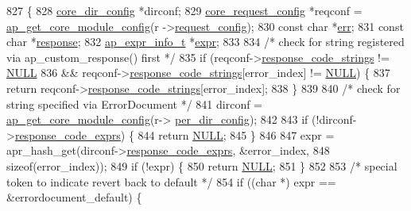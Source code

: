 \begin{DoxyCode}
827 \{
828     \hyperlink{structcore__dir__config}{core\_dir\_config} *dirconf;
829     \hyperlink{structcore__request__config}{core\_request\_config} *reqconf = \hyperlink{group__APACHE__CORE__HTTPD_ga5e96e185d9e95051576a4fbb7846ae51}{ap\_get\_core\_module\_config}(r
      ->\hyperlink{structrequest__rec_a64ddc7e883db1473c43254766c0c0c07}{request\_config});
830     \textcolor{keyword}{const} \textcolor{keywordtype}{char} *\hyperlink{group__AP__EXPR_gaccebe6c638c552d2845014cf8bdea8d8}{err};
831     \textcolor{keyword}{const} \textcolor{keywordtype}{char} *\hyperlink{group__MOD__DAV_ga61a23706db0e2c726e15a7a081345de7}{response};
832     \hyperlink{structap__expr__info__t}{ap\_expr\_info\_t} *\hyperlink{group__AP__EXPR_ga678330dc2f7e5114b38824a310f676ed}{expr};
833 
834     \textcolor{comment}{/* check for string registered via ap\_custom\_response() first */}
835     \textcolor{keywordflow}{if} (reqconf->\hyperlink{structcore__request__config_a12553976ceaa71260fc40cc5d3b41aa5}{response\_code\_strings} != \hyperlink{pcre_8txt_ad7f989d16aa8ca809a36bc392c07fba1}{NULL}
836             && reqconf->\hyperlink{structcore__request__config_a12553976ceaa71260fc40cc5d3b41aa5}{response\_code\_strings}[error\_index] != 
      \hyperlink{pcre_8txt_ad7f989d16aa8ca809a36bc392c07fba1}{NULL}) \{
837         \textcolor{keywordflow}{return} reqconf->\hyperlink{structcore__request__config_a12553976ceaa71260fc40cc5d3b41aa5}{response\_code\_strings}[error\_index];
838     \}
839 
840     \textcolor{comment}{/* check for string specified via ErrorDocument */}
841     dirconf = \hyperlink{group__APACHE__CORE__HTTPD_ga5e96e185d9e95051576a4fbb7846ae51}{ap\_get\_core\_module\_config}(r->
      \hyperlink{structrequest__rec_a0935ac19a61c462c8986898b4c30547d}{per\_dir\_config});
842 
843     \textcolor{keywordflow}{if} (!dirconf->\hyperlink{structcore__dir__config_a1fab962a8a35689fc897b2aac77b935e}{response\_code\_exprs}) \{
844         \textcolor{keywordflow}{return} \hyperlink{pcre_8txt_ad7f989d16aa8ca809a36bc392c07fba1}{NULL};
845     \}
846 
847     expr = apr\_hash\_get(dirconf->\hyperlink{structcore__dir__config_a1fab962a8a35689fc897b2aac77b935e}{response\_code\_exprs}, &error\_index,
848             \textcolor{keyword}{sizeof}(error\_index));
849     \textcolor{keywordflow}{if} (!expr) \{
850         \textcolor{keywordflow}{return} \hyperlink{pcre_8txt_ad7f989d16aa8ca809a36bc392c07fba1}{NULL};
851     \}
852 
853     \textcolor{comment}{/* special token to indicate revert back to default */}
854     \textcolor{keywordflow}{if} ((\textcolor{keywordtype}{char} *) expr == &errordocument\_default) \{

\end{DoxyCode}
